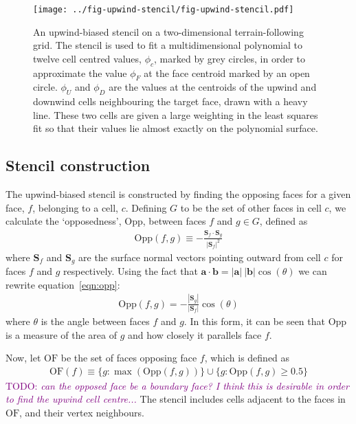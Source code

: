 \documentclass{article}
\newcommand{\TODO}[1]{\textcolor{purple}{TODO: \emph{#1}}}
\begin{document}
\begin{figure}
	\centering
	\texttt{[image: ../fig-upwind-stencil/fig-upwind-stencil.pdf]}
	\caption{An upwind-biased stencil on a two-dimensional terrain-following grid.  The stencil is used to fit a multidimensional polynomial to twelve cell centred values, $\phi_c$, marked by grey circles, in order to approximate the value $\phi_F$ at the face centroid marked by an open circle.  $\phi_U$ and $\phi_D$ are the values at the centroids of the upwind and downwind cells neighbouring the target face, drawn with a heavy line.  These two cells are given a large weighting in the least squares fit so that their values lie almost exactly on the polynomial surface.}
	\label{fig:upwind-stencil}
\end{figure}

\subsection{Stencil construction}
The upwind-biased stencil is constructed by finding the opposing faces for a given face, $f$, belonging to a cell, $c$.  Defining $G$ to be the set of other faces in cell $c$, we calculate the `opposedness', $\mathrm{Opp}$, between faces $f$ and $g \in G$, defined as
\begin{align}
	\mathrm{Opp}(f, g) \equiv - \frac{\mathbf{S}_f \cdot \mathbf{S}_g}{|\mathbf{S}_f|^2} \label{eqn:opp}
\end{align}
where $\mathbf{S}_f$ and $\mathbf{S}_g$ are the surface normal vectors pointing outward from cell $c$ for faces $f$ and $g$ respectively.
Using the fact that $\mathbf{a} \cdot \mathbf{b} = |\mathbf{a}|\:|\mathbf{b}| \cos(\theta)$ we can rewrite equation~\ref{eqn:opp}:
\begin{align}
	\mathrm{Opp}(f, g) = - \frac{|\mathbf{S}_g|}{|\mathbf{S}_f|} \cos(\theta)
\end{align}
where $\theta$ is the angle between faces $f$ and $g$.  In this form, it can be seen that $\mathrm{Opp}$ is a measure of the area of $g$ and how closely it parallels face $f$.

Now, let $\mathrm{OF}$ be the set of faces opposing face $f$, which is defined as
\begin{align}
	\mathrm{OF}(f) \equiv \{ g : \max(\mathrm{Opp}(f, g)) \} \cup \{ g : \mathrm{Opp}(f, g) \geq 0.5 \}
\end{align}
\TODO{can the opposed face be a boundary face?  I think this is desirable in order to find the upwind cell centre...}
The stencil includes cells adjacent to the faces in $\mathrm{OF}$, and their vertex neighbours.
\end{document}
